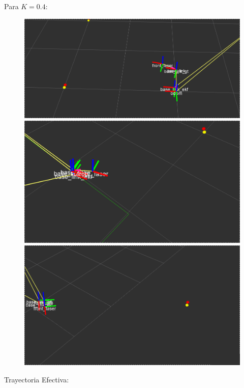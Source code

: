 Para $K=0.4$:

\begin{figure}[!htb]
  \includegraphics[width=\linewidth]{imagenesEKF/k0.4/1.png}
\endminipage\hfill
{}
  \includegraphics[width=\linewidth]{imagenesEKF/k0.4/2.png}
\endminipage\hfill
{}%
  \includegraphics[width=\linewidth]{imagenesEKF/k0.4/3.png}
\endminipage
\end{figure}
\FloatBarrier

Trayectoria Efectiva:

